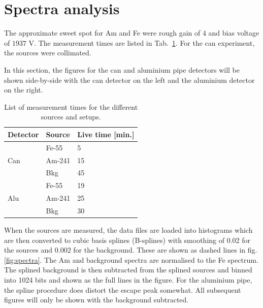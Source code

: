 \section{Spectra analysis}
The approximate sweet spot for Am and Fe were rough gain of $4$ and bias voltage of $1937$ V. The measurement times are listed in Tab.~\ref{tab:measurementstimes}. For the can experiment, the sources were collimated.

In this section, the figures for the can and aluminium pipe detectors will be shown side-by-side with the can detector on the left and the aluminium detector on the right.

\begin{table}[hb!]
\begin{tabular}{lll}
\textbf{Detector}    & \textbf{Source} & \textbf{Live time {[}min.{]}} \\ \hline
\multirow{3}{*}{Can} & Fe-55           & 5                          \\
                     & Am-241          & 15                         \\
                     & Bkg             & 45                         \\ \hline
\multirow{3}{*}{Alu} & Fe-55           & 19                         \\
                     & Am-241          & 25                         \\
                     & Bkg             & 30                         \\ \hline
\end{tabular}
\caption{List of measurement times for the different sources and setups.}
\label{tab:measurementstimes}
\end{table}

When the sources are measured, the data files are loaded into histograms which are then converted to cubic basis splines (B-splines) with smoothing of 0.02 for the sources and 0.002 for the background. These are shown as dashed lines in fig. \ref{fig:spectra}. The Am and background spectra are normalised to the Fe spectrum. The splined background is then subtracted from the splined sources and binned into 1024 bits and shown as the full lines in the figure. For the aluminium pipe, the spline procedure does distort the escape peak somewhat. All subsequent figures will only be shown with the background subtracted.

